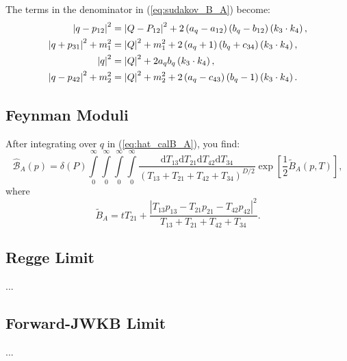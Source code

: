 The terms in the denominator in (\ref{eq:sudakov_B_A}) become:
\begin{align}
	\left\lvert q - p_{12} \right\rvert^{2} &= \left\lvert Q - P_{12} \right\rvert^{2} + 2 \left(a_{q} - a_{12}\right)\left(b_{q} - b_{12}\right)\left(k_{3} \cdot k_{4}\right), \\
	\left\lvert q + p_{31} \right\rvert^{2} + m_{1}^{2} &= \left\lvert Q \right\rvert^{2} + m_{1}^{2} + 2 \left(a_{q} + 1\right)\left(b_{q} + c_{34}\right)\left(k_{3} \cdot k_{4}\right), \\
	\left\lvert q \right\rvert^{2} &= \left\lvert Q \right\rvert^{2} + 2 a_{q} b_{q} \left(k_{3} \cdot k_{4}\right), \\
	\left\lvert q - p_{42} \right\rvert^{2} + m_{2}^{2} &= \left\lvert Q \right\rvert^{2} + m_{2}^{2} + 2 \left(a_{q} - c_{43}\right)\left(b_{q} - 1\right)\left(k_{3} \cdot k_{4}\right).
\end{align}
\subsection{Feynman Moduli}
After integrating over $q$ in (\ref{eq:hat_calB_A}), you find:
\begin{equation}
	\widehat{\mathcal{B}}_{A}(p) = \delta(P) \int\limits_{0}^{\infty} \int\limits_{0}^{\infty} \int\limits_{0}^{\infty} \int\limits_{0}^{\infty} \frac{\mathrm{d}T_{13} \mathrm{d}T_{21} \mathrm{d}T_{42} \mathrm{d}T_{34}}{(T_{13} + T_{21} + T_{42} + T_{34})^{D/2}} \exp{\left[ \frac{1}{2} \tilde{B}_{A}(p, T) \right]},
\end{equation}
where
\begin{equation}
	\tilde{B}_{A} = t T_{21} + \frac{|T_{13} p_{13} - T_{21} p_{21} - T_{42} p_{42}|^{2}}{T_{13} + T_{21} + T_{42} + T_{34}}.
\end{equation}
\subsection{Regge Limit}
...
\subsection{Forward-JWKB Limit}
...
